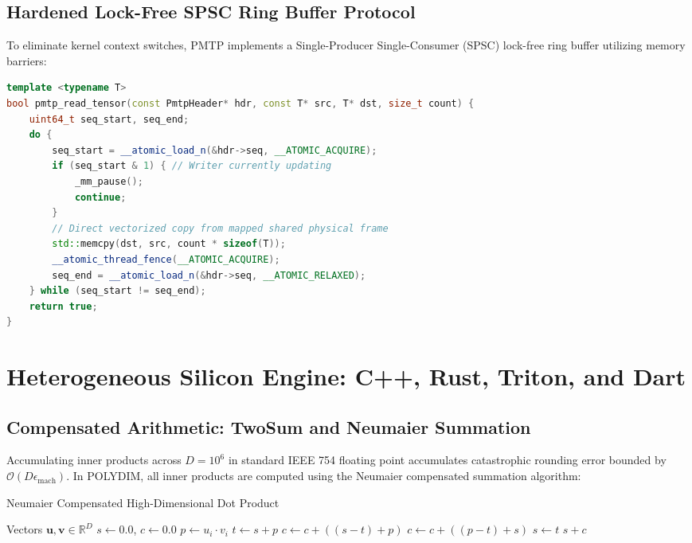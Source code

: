 \documentclass[11pt,twoside,a4paper]{article}
\theoremstyle{plain}
\theoremstyle{definition}
\theoremstyle{remark}
\newcommand{\R}{\mathbb{R}}
\begin{document}
\subsection{Hardened Lock-Free SPSC Ring Buffer Protocol}

To eliminate kernel context switches, PMTP implements a Single-Producer Single-Consumer (SPSC) lock-free ring buffer utilizing memory barriers:

\begin{lstlisting}[language=C++, basicstyle=\ttfamily\scriptsize, frame=single, caption={PMTP Hardened SEQLock Read Protocol in C++20}]
template <typename T>
bool pmtp_read_tensor(const PmtpHeader* hdr, const T* src, T* dst, size_t count) {
    uint64_t seq_start, seq_end;
    do {
        seq_start = __atomic_load_n(&hdr->seq, __ATOMIC_ACQUIRE);
        if (seq_start & 1) { // Writer currently updating
            _mm_pause();
            continue;
        }
        // Direct vectorized copy from mapped shared physical frame
        std::memcpy(dst, src, count * sizeof(T));
        __atomic_thread_fence(__ATOMIC_ACQUIRE);
        seq_end = __atomic_load_n(&hdr->seq, __ATOMIC_RELAXED);
    } while (seq_start != seq_end);
    return true;
}
\end{lstlisting}

\section{Heterogeneous Silicon Engine: C++, Rust, Triton, and Dart}
\label{sec:heterogeneous_silicon}

\subsection{Compensated Arithmetic: TwoSum and Neumaier Summation}

Accumulating inner products across $D = 10^6$ in standard IEEE 754 floating point accumulates catastrophic rounding error bounded by $\mathcal{O}(D \epsilon_{\text{mach}})$. In POLYDIM, all inner products are computed using the Neumaier compensated summation algorithm:

\begin{algorithm}[H]
\caption{Neumaier Compensated High-Dimensional Dot Product}
\begin{algorithmic}[1]
\Require Vectors $\mathbf{u}, \mathbf{v} \in \R^D$
\State $s \gets 0.0$, $c \gets 0.0$
    \State $p \gets u_i \cdot v_i$
    \State $t \gets s + p$
        \State $c \gets c + ((s - t) + p)$
    \Else
        \State $c \gets c + ((p - t) + s)$
    \EndIf
    \State $s \gets t$
\EndFor
\State \Return $s + c$
\end{algorithmic}
\end{algorithm}
\end{document}
